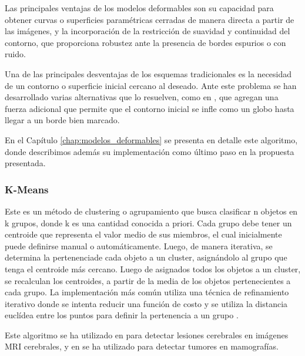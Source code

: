Las principales ventajas de los modelos deformables son su capacidad para obtener curvas o superficies paramétricas cerradas de manera directa a partir de las imágenes, y la incorporación de la restricción de suavidad y continuidad del contorno, que proporciona robustez ante la presencia de bordes espurios o con ruido.

Una de las principales desventajas de los esquemas tradicionales es la necesidad de un contorno o superficie inicial cercano al deseado. Ante este problema se han desarrollado varias alternativas que lo resuelven, como en \citep{cohen1991active}, que agregan una fuerza adicional que permite que el contorno inicial se infle como un globo hasta llegar a un borde bien marcado.

En el Capítulo \ref{chap:modelos_deformables} se presenta en detalle este algoritmo, donde describimos además su implementación como último paso en la propuesta presentada.

\subsubsection{K-Means}
Este es un método de clustering o agrupamiento que busca clasificar n objetos en k grupos, donde k es una cantidad conocida a priori. Cada grupo debe tener un centroide que representa el valor medio de sus miembros, el cual inicialmente puede definirse manual o automáticamente. Luego, de manera iterativa, se determina la pertenenciade cada objeto a un cluster, asignándolo al grupo que tenga el centroide más cercano. Luego de asignados todos los objetos a un cluster, se recalculan los centroides, a partir de la media de los objetos pertenecientes a cada grupo. La implementación más común utiliza una técnica de refinamiento iterativo donde se intenta reducir una función de costo y se utiliza la distancia euclídea entre los puntos para definir la pertenencia a un grupo \citep{macqueen1967some}.
 
Este algoritmo se ha utilizado en \citep{juang2010mri} para detectar lesiones cerebrales en imágenes MRI cerebrales, y en \citep{dalmiya2012application} se ha utilizado  para detectar tumores en mamografías.

